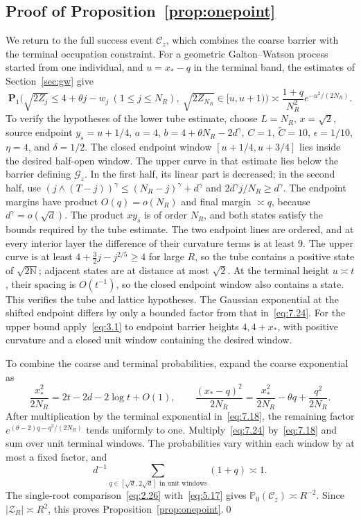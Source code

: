 \documentclass[11pt,letterpaper,reqno]{amsart}
\numberwithin{equation}{section}
\theoremstyle{remark}
\begin{document}
\subsection{Proof of Proposition~\ref{prop:onepoint}}\label{sec:coarseonepoint}\label{sec:firstmomentcompletion}
We return to the full success event $\mathcal C_z$, which combines the coarse barrier with the terminal occupation constraint. For a geometric Galton--Watson process started from one individual, and $u=x_*-q$ in the terminal band, the estimates of Section~\ref{sec:gw} give
\begin{equation}\label{eq:7.24}
\mathbf P_1\bigl(\sqrt{2Z_j}\le4+\theta j-w_j\ (1\le j\le N_R),
\ \sqrt{2Z_{N_R}}\in[u,u+1)\bigr)
\asymp\frac{1+q}{N_R^2}e^{-u^2/(2N_R)}.
\end{equation}
To verify the hypotheses of the lower tube estimate, choose
$L=N_R$, $x=\sqrt2$, source endpoint $y_s=u+1/4$,
$a=4$, $b=4+\theta N_R-2d^\gamma$, $C=1$, $\widetilde C=10$,
$\epsilon=1/10$, $\eta=4$, and $\delta=1/2$.
The closed endpoint window $[u+1/4,u+3/4]$ lies inside the desired half-open window.
The upper curve in that estimate lies below the barrier defining $\mathcal G_z$. In the first half, its linear part is decreased; in the second half, use
$(j\wedge(T-j))^\gamma\le(N_R-j)^\gamma+d^\gamma$ and
$2d^\gamma j/N_R\ge d^\gamma$.
The endpoint margins have product $O(q)=o(N_R)$ and final margin $\asymp q$, because $d^\gamma=o(\sqrt d)$. The product $xy_s$ is of order $N_R$, and both states satisfy the bounds required by the tube estimate.
The two endpoint lines are ordered, and at every interior layer the difference of their curvature terms is at least $9$. The upper curve is at least $4+\tfrac32j-j^{2/5}\ge4$ for large $R$, so the tube contains a positive state of $\sqrt{2\mathbb N}$; adjacent states are at distance at most $\sqrt2$.
At the terminal height $u\asymp t$, their spacing is $O(t^{-1})$, so the closed endpoint window also contains a state. This verifies the tube and lattice hypotheses. The Gaussian exponential at the shifted endpoint differs by only a bounded factor from that in~\eqref{eq:7.24}.
For the upper bound apply~\eqref{eq:3.1} to endpoint barrier heights $4,4+x_*$, with positive curvature and a closed unit window containing the desired window.

To combine the coarse and terminal probabilities, expand the coarse exponential as
\begin{equation}\label{eq:7.26}
\frac{x_*^2}{2N_R}=2t-2d-2\log t+O(1),\qquad
\frac{(x_*-q)^2}{2N_R}=\frac{x_*^2}{2N_R}-\theta q+\frac{q^2}{2N_R}.
\end{equation}
After multiplication by the terminal exponential in~\eqref{eq:7.18}, the remaining factor $e^{(\theta-2)q-q^2/(2N_R)}$ tends uniformly to one.
Multiply~\eqref{eq:7.24} by~\eqref{eq:7.18} and sum over unit terminal windows. The probabilities vary within each window by at most a fixed factor, and
\begin{equation}\label{eq:7.27}
d^{-1}\sum_{q\in[\sqrt d,2\sqrt d]\text{ in unit windows}}(1+q)\asymp1.
\end{equation}
The single-root comparison~\eqref{eq:2.26} with~\eqref{eq:5.17} gives
$\mathbb P_0(\mathcal C_z)\asymp R^{-2}$. Since $|\mathscr Z_R|\asymp R^2$, this proves Proposition~\ref{prop:onepoint}.\qed
\end{document}
